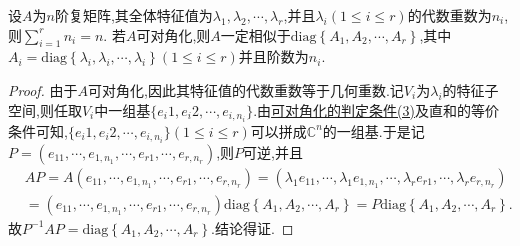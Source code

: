 \documentclass[../../main.tex]{subfiles}
\begin{document}
\begin{theorem}\label{theorem:矩阵可对角化一定相似于由其全体特征值构成的对角阵}
设$A$为$n$阶复矩阵,其全体特征值为$\lambda_1,\lambda_2,\cdots,\lambda_r$,并且$\lambda_i\left( 1\le i\le r \right)$的代数重数为$n_i$,则$\sum_{i=1}^{r}n_i=n$. 若$A$可对角化,则$A$一定相似于$\mathrm{diag}\left\{ A_1,A_2,\cdots ,A_r \right\}$,其中$A_i=\mathrm{diag}\left\{ \lambda _i,\lambda _i,\cdots ,\lambda _i \right\} \left( 1\le i\le r \right)$并且阶数为$n_i$.
\end{theorem}
\begin{proof}
由于$A$可对角化,因此其特征值的代数重数等于几何重数.记$V_i$为$\lambda_i$的特征子空间,则任取$V_i$中一组基$\{e_i1,e_i2,\cdots,e_{i,n_i}\}$.由\hyperref[theorem:可对角化的判定条件]{可对角化的判定条件(3)}及直和的等价条件可知,$\{e_i1,e_i2,\cdots,e_{i,n_i}\}\left( 1\le i\le r \right)$可以拼成$\mathbb{C}^n$的一组基.于是记$P=(e_{11},\cdots,e_{1,n_1},\cdots,e_{r1},\cdots,e_{r,n_r})$,则$P$可逆,并且
\begin{align*}
&AP=A\left( e_{11},\cdots ,e_{1,n_1},\cdots ,e_{r1},\cdots ,e_{r,n_r} \right) =\left( \lambda _1e_{11},\cdots ,\lambda _1e_{1,n_1},\cdots ,\lambda _re_{r1},\cdots ,\lambda _re_{r,n_r} \right) 
\\
&=\left( e_{11},\cdots ,e_{1,n_1},\cdots ,e_{r1},\cdots ,e_{r,n_r} \right) \mathrm{diag}\left\{ A_1,A_2,\cdots ,A_r \right\} =P\mathrm{diag}\left\{ A_1,A_2,\cdots ,A_r \right\} .
\end{align*}
故$P^{-1}AP=\mathrm{diag}\left\{ A_1,A_2,\cdots ,A_r \right\} .$结论得证.
\end{proof}
\end{document}
